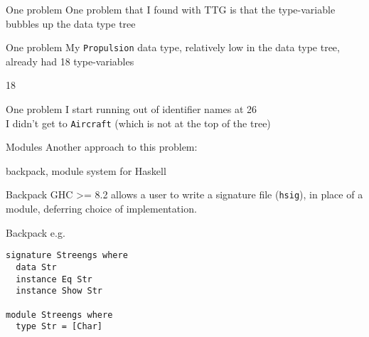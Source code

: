 \begin{frame}[fragile]
\begin{block}{One problem}
One problem that I found with TTG is that the type-variable bubbles up the data type tree
\end{block}
\end{frame}

\begin{frame}[fragile]
\begin{block}{One problem}
My \lstinline{Propulsion} data type, relatively low in the data type tree, already had 18 type-variables
\end{block}
\end{frame}

\begin{frame}[fragile]
\begin{center}
\large{18}
\end{center}
\end{frame}

\begin{frame}[fragile]
\begin{block}{One problem}
I start running out of identifier names at 26
\\[13pt]
I didn't get to \lstinline{Aircraft} \tiny{(which is not at the top of the tree)}
\end{block}
\end{frame}

\begin{frame}[fragile]
\begin{block}{Modules}
Another approach to this problem:

backpack, module system for Haskell
\end{block}
\end{frame}

\begin{frame}[fragile]
\begin{block}{Backpack}
GHC >= 8.2 allows a user to write a signature file (\lstinline{hsig}), in place
of a module, deferring choice of implementation.
\end{block}
\end{frame}

\begin{frame}[fragile]
\begin{block}{Backpack e.g.}
\begin{lstlisting}[style=haskell]
signature Streengs where
  data Str
  instance Eq Str
  instance Show Str

module Streengs where
  type Str = [Char]
\end{lstlisting}
\end{block}
\end{frame}

